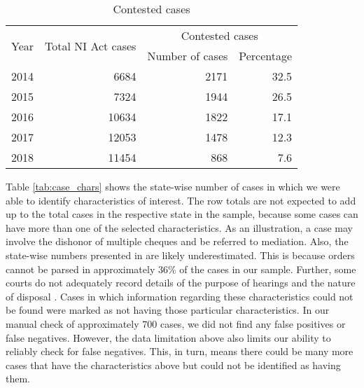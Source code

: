 \documentclass[12pt,a4paper]{article}
\begin{document}
\begin{description}
		\begin{table}[!ht]
			\caption{Contested cases}\label{tab:cont_yearWise}			
			\centering
			\footnotesize
			\begin{tabular}{@{}lrrr@{}}
				\toprule
				\multirow{2}{*}{Year} & \multirow{2}{*}{Total NI Act cases} & \multicolumn{2}{c}{Contested cases}\\
				\cmidrule{3-4}
				&& Number of cases & Percentage \\
				\midrule%
				2014 & 6684 & 2171 & 32.5 \\
				2015 & 7324 & 1944 & 26.5 \\
				2016 & 10634 & 1822 & 17.1 \\
				2017 & 12053 & 1478 & 12.3 \\
				2018 & 11454 & 868 & 7.6 \\
				\bottomrule
			\end{tabular}
		\end{table}
		
		\item[]
		
	\end{description}
	
	Table \ref{tab:case_chars} shows the state-wise number of cases in which we were able to identify characteristics of interest. The row totals are not expected to add up to the total cases in the respective state in the sample, because some cases can have more than one of the selected characteristics. As an illustration, a case may involve the dishonor of multiple cheques and be referred to mediation. Also, the state-wise numbers presented in  are likely underestimated. This is because orders cannot be parsed in approximately 36\% of the cases in our sample. Further, some courts do not adequately record details of the purpose of hearings and the nature of disposal \autocite{damle2020_ecourtsData}. Cases in which information regarding these characteristics could not be found were marked as not having those particular characteristics. In our manual check of approximately 700 cases, we did not find any false positives or false negatives. However, the data limitation above also limits our ability to reliably check for false negatives. This, in turn, means there could be many more cases that have the characteristics above but could not be identified as having them.
	
\end{document}
